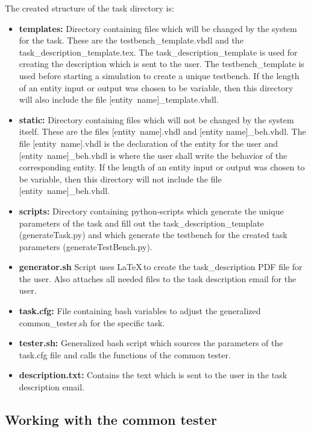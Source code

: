 The created structure of the task directory is:
\begin{itemize}
\item {\bf templates:} Directory containing files which will be changed by the system for the task. These are the testbench\_template.vhdl and the task\_description\_template.tex. The task\_description\_template is used for creating the description which is sent to the user. The testbench\_template is used before starting a simulation to create a unique testbench. If the length of an entity input or output was chosen to be variable, then this directory will also include the file \mbox{[entity name]\_template.vhdl}.
\item {\bf static:} Directory containing files which will not be changed by the system itself. These are the files \mbox{[entity name].vhdl} and [entity name]\_beh.vhdl. The file \mbox{[entity name].vhdl} is the declaration of the entity for the user and \mbox{[entity name]\_beh.vhdl} is where the user shall write the behavior of the corresponding entity. If the length of an entity input or output was chosen to be variable, then this directory will not include the file \mbox{[entity name]\_beh.vhdl}.
\item {\bf scripts:} Directory containing python-scripts which generate the unique parameters of the task and fill out the task\_description\_template (generateTask.py) and which generate the testbench for the created task parameters (generateTestBench.py).
\item {\bf generator.sh} Script uses \LaTeX\,to create the task\_description PDF file for the user. Also attaches all needed files to the task description email for the user.
\item {\bf task.cfg:} File containing bash variables to adjust the generalized common\_tester.sh for the specific task.
\item {\bf tester.sh:} Generalized bash script which sources the parameters of the task.cfg file and calls the functions of the common tester.
\item {\bf description.txt:} Contains the text which is sent to the user in the task description email. 
\end{itemize}


\subsection{Working with the common tester} \label{sub:testercommon}


